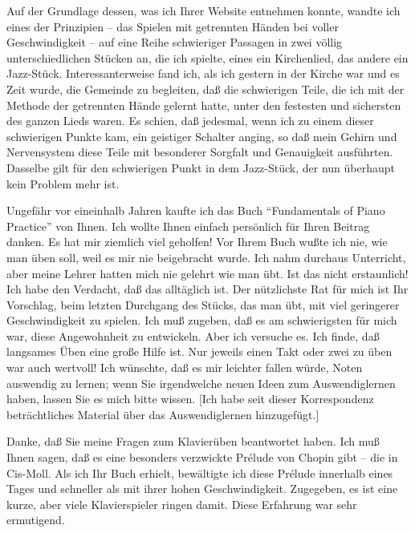 \item \label{testimonials12}
Auf der Grundlage dessen, was ich Ihrer Website entnehmen konnte, wandte ich eines der Prinzipien -- das Spielen mit getrennten Händen bei voller Geschwindigkeit -- auf eine Reihe schwieriger Passagen in zwei völlig unterschiedlichen Stücken an, die ich spielte, eines ein Kirchenlied, das andere ein Jazz-Stück.
Interessanterweise fand ich, als ich gestern in der Kirche war und es Zeit wurde, die Gemeinde zu begleiten, daß die schwierigen Teile, die ich mit der Methode der getrennten Hände gelernt hatte, unter den festesten und sichersten des ganzen Lieds waren.
Es schien, daß jedesmal, wenn ich zu einem dieser schwierigen Punkte kam, ein geistiger Schalter anging, so daß mein Gehirn und Nervensystem diese Teile mit besonderer Sorgfalt und Genauigkeit ausführten.
Dasselbe gilt für den schwierigen Punkt in dem Jazz-Stück, der nun überhaupt kein Problem mehr ist.


\item \label{testimonials13}
Ungefähr vor eineinhalb Jahren kaufte ich das Buch \enquote{Fundamentals of Piano Practice} von Ihnen.
Ich wollte Ihnen einfach persönlich für Ihren Beitrag danken.
Es hat mir ziemlich viel geholfen!
Vor Ihrem Buch wußte ich nie, wie man üben soll, weil es mir nie beigebracht wurde.
Ich nahm durchaus Unterricht, aber meine Lehrer hatten mich nie gelehrt wie man übt.
Ist das nicht erstaunlich!
Ich habe den Verdacht, daß das alltäglich ist.
Der nützlichste Rat für mich ist Ihr Vorschlag, beim letzten Durchgang des Stücks, das man übt, mit viel geringerer Geschwindigkeit zu spielen.
Ich muß zugeben, daß es am schwierigsten für mich war, diese Angewohnheit zu entwickeln.
Aber ich versuche es.
Ich finde, daß langsames Üben eine große Hilfe ist.
Nur jeweils einen Takt oder zwei zu üben war auch wertvoll!
Ich wünschte, daß es mir leichter fallen würde, Noten auswendig zu lernen; wenn Sie irgendwelche neuen Ideen zum Auswendiglernen haben, lassen Sie es mich bitte wissen.
[Ich habe seit dieser Korrespondenz beträchtliches Material über das Auswendiglernen hinzugefügt.]


\item \label{testimonials14}
Danke, daß Sie meine Fragen zum Klavierüben beantwortet haben.
Ich muß Ihnen sagen, daß es eine besonders verzwickte Prélude von Chopin gibt -- die in Cis-Moll.
Als ich Ihr Buch erhielt, bewältigte ich diese Prélude innerhalb eines Tages und schneller als mit ihrer hohen Geschwindigkeit.
Zugegeben, es ist eine kurze, aber viele Klavierspieler ringen damit.
Diese Erfahrung war sehr ermutigend.


